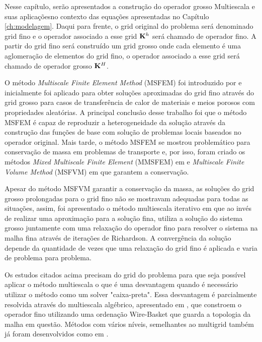
Nesse capítulo, serão apresentados a construção do operador grosso Multiescala e suas aplicaçõesno contexto das equações apresentadas no Capítulo \ref{ch:modelagem}. Daqui para frente, o grid original do problema será denominado grid fino e o operador associado a esse grid $\mathbf{K}^h$ será chamado de operador fino. A partir do grid fino será construído um grid grosso onde cada elemento é uma aglomeração de elementos do grid fino, o operador associado a esse grid será chamado de operador grosso $\mathbf{K}^H$.


O método \textit{Multiscale Finite Element Method} (MSFEM) foi introduzido por \citet{thomashou} e inicialmente foi aplicado para obter soluções aproximadas do grid fino através do grid grosso para casos de transferência de calor de materiais e meios porosos com propriedades aleatórias. A principal conclusão desse trabalho foi que o método MSFEM é capaz de reproduzir a heterogeneidade da solução através da construção das funções de base com solução de problemas locais baseados no operador original. Mais tarde, o método MSFEM se mostrou problemático para conservação de massa em problemas de transporte e, por isso, foram criado os métodos \textit{Mixed Multiscale Finite Element} (MMSFEM) em \citet{mixedmsfem} e  \textit{Multiscale Finite Volume Method} (MSFVM) em \citet{msfv} que garantem a conservação.


Apesar do método MSFVM garantir a conservação da massa, as soluções do grid grosso prolongadas para o grid fino não se mostravam adequadas para todas as situações, assim, foi apresentado o método multiescala iterativo em \citet{iterativems} que ao invés de realizar uma aproximação para a solução fina, utiliza a solução do sistema grosso juntamente com uma relaxação do operador fino para resolver o sistema na malha fina através de iterações de Richardson. A convergência da solução depende da quantidade de vezes que uma relaxação do grid fino é aplicada e varia de problema para problema.


Os estudos citados acima precisam do grid do problema para que seja possível aplicar o método multiescala o que é uma desvantagem quando é necessário utilizar o método como um solver "caixa-preta". Essa desvantagem é parcialmente resolvida através do multiescala algébrico, apresentado em \citet{msalgebrico}, que constroem o operador fino utilizando uma ordenação Wire-Basket que guarda a topologia da malha em questão. Métodos com vários níveis, semelhantes ao multigrid também já foram desenvolvidos como em \citet{multilevel}. 

